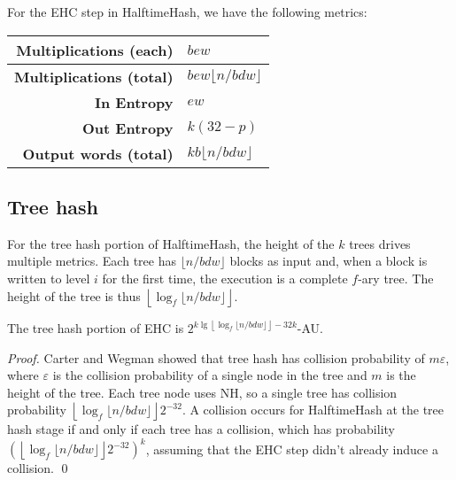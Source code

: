 \documentclass[runningheads]{llncs}
\begin{document}

For the EHC step in HalftimeHash, we have the following metrics:

\begin{tabular}{|r|l|}
    \hline {\bf Multiplications (each)} & $b e w$ \\
    \hline {\bf Multiplications (total)} & $b e w \lfloor n / b d w\rfloor$ \\
    \hline {\bf In Entropy} & $e w$ \\
    \hline {\bf Out Entropy} & $k (32-p)$\\
    \hline {\bf Output words (total)} & $k b \lfloor n / b d w\rfloor $\\
    \hline
\end{tabular}


\subsection{Tree hash}

For the tree hash portion of HalftimeHash, the height of the $k$ trees drives multiple metrics.
Each tree has $\lfloor n / b d w \rfloor$ blocks as input and, when a block is written to level $i$ for the first time, the execution is a complete $f$-ary tree.
The height of the tree is thus $\left\lfloor \log_f \lfloor n / b d w \rfloor \right\rfloor$.

\begin{lemma}
The tree hash portion of EHC is $2^{ k\lg\left\lfloor\log_f \lfloor n/b d w\rfloor\right\rfloor - 32k}$-AU.
\end{lemma}
\begin{proof}
  Carter and Wegman showed that tree hash has collision probability of $m \varepsilon$, where $\varepsilon$ is the collision probability of a single node in the tree and $m$ is the height of the tree.
  Each tree node uses NH, so a single tree has collision probability $\left\lfloor \log_f \lfloor n / b d w \rfloor \right\rfloor 2^{-32}$.
  A collision occurs for HalftimeHash at the tree hash stage if and only if each tree has a collision, which has probability $\left(\left\lfloor \log_f \lfloor n / b d w \rfloor \right\rfloor 2^{-32}\right)^k$, assuming that the EHC step didn't already induce a collision. \qed
\end{proof}
\end{document}
